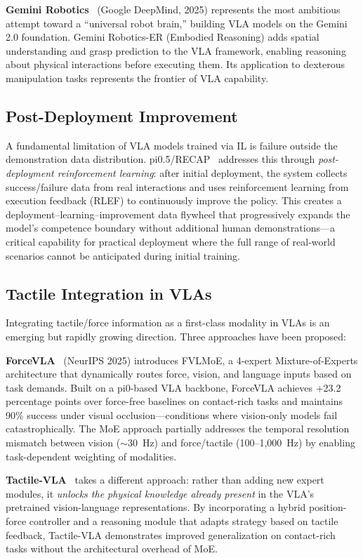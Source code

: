 \textbf{Gemini Robotics}~\cite{google2025gemini} (Google DeepMind, 2025) represents the most ambitious attempt toward a ``universal robot brain,'' building VLA models on the Gemini 2.0 foundation. Gemini Robotics-ER (Embodied Reasoning) adds spatial understanding and grasp prediction to the VLA framework, enabling reasoning about physical interactions before executing them. Its application to dexterous manipulation tasks represents the frontier of VLA capability.

\subsection{Post-Deployment Improvement}

A fundamental limitation of VLA models trained via IL is failure outside the demonstration data distribution. pi0.5/RECAP~\cite{pi2025recap} addresses this through \emph{post-deployment reinforcement learning}: after initial deployment, the system collects success/failure data from real interactions and uses reinforcement learning from execution feedback (RLEF) to continuously improve the policy. This creates a deployment--learning--improvement data flywheel that progressively expands the model's competence boundary without additional human demonstrations---a critical capability for practical deployment where the full range of real-world scenarios cannot be anticipated during initial training.

\subsection{Tactile Integration in VLAs}

Integrating tactile/force information as a first-class modality in VLAs is an emerging but rapidly growing direction. Three approaches have been proposed:

\textbf{ForceVLA}~\cite{yu2025forcevla} (NeurIPS 2025) introduces FVLMoE, a 4-expert Mixture-of-Experts architecture that dynamically routes force, vision, and language inputs based on task demands. Built on a pi0-based VLA backbone, ForceVLA achieves +23.2 percentage points over force-free baselines on contact-rich tasks and maintains 90\% success under visual occlusion---conditions where vision-only models fail catastrophically. The MoE approach partially addresses the temporal resolution mismatch between vision ($\sim$30~Hz) and force/tactile (100--1{,}000~Hz) by enabling task-dependent weighting of modalities.

\textbf{Tactile-VLA}~\cite{huang2025tactilevla} takes a different approach: rather than adding new expert modules, it \emph{unlocks the physical knowledge already present} in the VLA's pretrained vision-language representations. By incorporating a hybrid position-force controller and a reasoning module that adapts strategy based on tactile feedback, Tactile-VLA demonstrates improved generalization on contact-rich tasks without the architectural overhead of MoE.

